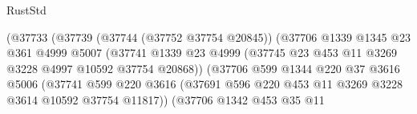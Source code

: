 \begin{lexlean}{RustStd}
\begin{coremodule}
                                    (@37733
                                      (@37739
                                        (@37744 (@37752 @37754 @20845))
                                        (@37706
                                          @1339
                                          @1345
                                          @23
                                          @361
                                          @4999
                                          @5007
                                          (@37741
                                            @1339
                                            @23
                                            @4999
                                            (@37745
                                              @23
                                              @453
                                              @11
                                              @3269
                                              @3228
                                              @4997
                                              @10592
                                              @37754
                                              @20868))
                                          (@37706
                                            @599
                                            @1344
                                            @220
                                            @37
                                            @3616
                                            @5006
                                            (@37741
                                              @599
                                              @220
                                              @3616
                                              (@37691
                                                @596
                                                @220
                                                @453
                                                @11
                                                @3269
                                                @3228
                                                @3614
                                                @10592
                                                @37754
                                                @11817))
                                            (@37706
                                              @1342
                                              @453
                                              @35
                                              @11

\end{coremodule}
\end{lexlean}
